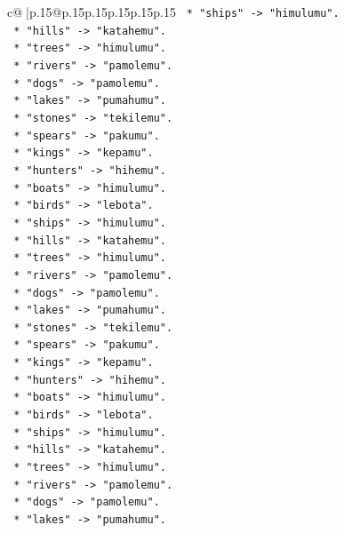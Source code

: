 \documentclass{article}
\begin{document}
{\begin{supertabular}{c@{$\;$}|p{.15\linewidth}@{}p{.15\linewidth}p{.15\linewidth}p{.15\linewidth}p{.15\linewidth}p{.15\linewidth}}
{{{\texttt{        *   "ships" {-}> "himulumu".} \\
\texttt{        *   "hills" {-}> "katahemu".} \\
\texttt{        *   "trees" {-}> "himulumu".} \\
\texttt{        *   "rivers" {-}> "pamolemu".} \\
\texttt{        *   "dogs" {-}> "pamolemu".} \\
\texttt{        *   "lakes" {-}> "pumahumu".} \\
\texttt{        *   "stones" {-}> "tekilemu".} \\
\texttt{        *   "spears" {-}> "pakumu".} \\
\texttt{        *   "kings" {-}> "kepamu".} \\
\texttt{        *   "hunters" {-}> "hihemu".} \\
\texttt{        *   "boats" {-}> "himulumu".} \\
\texttt{        *   "birds" {-}> "lebota".} \\
\texttt{        *   "ships" {-}> "himulumu".} \\
\texttt{        *   "hills" {-}> "katahemu".} \\
\texttt{        *   "trees" {-}> "himulumu".} \\
\texttt{        *   "rivers" {-}> "pamolemu".} \\
\texttt{        *   "dogs" {-}> "pamolemu".} \\
\texttt{        *   "lakes" {-}> "pumahumu".} \\
\texttt{        *   "stones" {-}> "tekilemu".} \\
\texttt{        *   "spears" {-}> "pakumu".} \\
\texttt{        *   "kings" {-}> "kepamu".} \\
\texttt{        *   "hunters" {-}> "hihemu".} \\
\texttt{        *   "boats" {-}> "himulumu".} \\
\texttt{        *   "birds" {-}> "lebota".} \\
\texttt{        *   "ships" {-}> "himulumu".} \\
\texttt{        *   "hills" {-}> "katahemu".} \\
\texttt{        *   "trees" {-}> "himulumu".} \\
\texttt{        *   "rivers" {-}> "pamolemu".} \\
\texttt{        *   "dogs" {-}> "pamolemu".} \\
\texttt{        *   "lakes" {-}> "pumahumu".} \\
}}}
\end{supertabular}}
\end{document}
